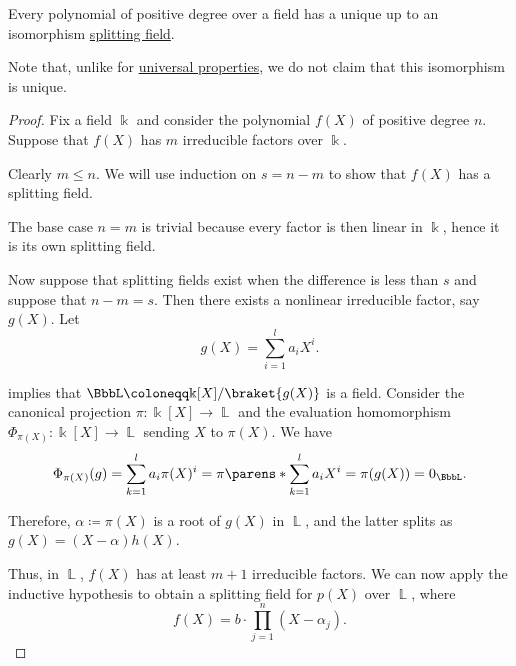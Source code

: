 \begin{proposition}\label{thm:splitting_field_existence}
  Every polynomial of positive degree over a field has a unique up to an isomorphism \hyperref[def:splitting_field]{splitting field}.
\end{proposition}
\begin{comments}
  \item Note that, unlike for \hyperref[con:universal_property]{universal properties}, we do not claim that this isomorphism is unique.
\end{comments}
\begin{proof}
  \ExistenceSubProof{} Fix a field \( \Bbbk \) and consider the polynomial \( f(X) \) of positive degree \( n \). Suppose that \( f(X) \) has \( m \) irreducible factors over \( \Bbbk \).

  Clearly \( m \leq n \). We will use induction on \( s = n - m \) to show that \( f(X) \) has a splitting field.

  The base case \( n = m \) is trivial because every factor is then linear in \( \Bbbk \), hence it is its own splitting field.

  Now suppose that splitting fields exist when the difference is less than \( s \) and suppose that \( n - m = s \). Then there exists a nonlinear irreducible factor, say \( g(X) \). Let
  \begin{equation*}
    g(X) = \sum_{i=1}^l a_i X^i.
  \end{equation*}

   implies that \( \BbbL \coloneqq \Bbbk[X] / \braket{ g(X) } \) is a field. Consider the canonical projection \( \pi: \Bbbk[X] \to \BbbL \) and the evaluation homomorphism \( \Phi_{\pi(X)}: \Bbbk[X] \to \BbbL \) sending \( X \) to \( \pi(X) \). We have
  \begin{equation*}
    \Phi_{\pi(X)}(g) = \sum_{k=1}^l a_i \pi(X)^i = \pi\parens*{ \sum_{k=1}^l a_i X^i } = \pi(g(X)) = 0_\BbbL.
  \end{equation*}

  Therefore, \( \alpha \coloneqq \pi(X) \) is a root of \( g(X) \) in \( \BbbL \), and the latter splits as \( g(X) = (X - \alpha) h(X) \).

  Thus, in \( \BbbL \), \( f(X) \) has at least \( m + 1 \) irreducible factors. We can now apply the inductive hypothesis to obtain a splitting field for \( p(X) \) over \( \BbbL \), where
  \begin{equation*}
    f(X) = b \cdot \prod_{j=1}^n (X - \alpha_j).
  \end{equation*}


\end{proof}
